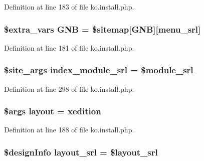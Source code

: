 Definition at line 183 of file ko.\+install.\+php.

\subsubsection[{\texorpdfstring{G\+NB}{GNB}}]{\setlength{\rightskip}{0pt plus 5cm}\${\bf extra\+\_\+vars} G\+NB = \$sitemap\mbox{[}\textquotesingle{}G\+NB\textquotesingle{}\mbox{]}\mbox{[}\textquotesingle{}menu\+\_\+srl\textquotesingle{}\mbox{]}}\hypertarget{ko_8install_8php_a9b1716b68fc04f3492448f38148dcbf5}{}\label{ko_8install_8php_a9b1716b68fc04f3492448f38148dcbf5}


Definition at line 181 of file ko.\+install.\+php.

\subsubsection[{\texorpdfstring{index\+\_\+module\+\_\+srl}{index_module_srl}}]{\setlength{\rightskip}{0pt plus 5cm}\$site\+\_\+args index\+\_\+module\+\_\+srl = \${\bf module\+\_\+srl}}\hypertarget{ko_8install_8php_acd0b17bfe6d14c82871d73fa39c9c22d}{}\label{ko_8install_8php_acd0b17bfe6d14c82871d73fa39c9c22d}


Definition at line 298 of file ko.\+install.\+php.

\subsubsection[{\texorpdfstring{layout}{layout}}]{\setlength{\rightskip}{0pt plus 5cm}\$args {\bf layout} = \textquotesingle{}xedition\textquotesingle{}}\hypertarget{ko_8install_8php_a0dc2cdff7167f362443808ff71ae5177}{}\label{ko_8install_8php_a0dc2cdff7167f362443808ff71ae5177}


Definition at line 188 of file ko.\+install.\+php.

\subsubsection[{\texorpdfstring{layout\+\_\+srl}{layout_srl}}]{\setlength{\rightskip}{0pt plus 5cm}\$design\+Info layout\+\_\+srl = \$layout\+\_\+srl}\hypertarget{ko_8install_8php_a70054876db09b2519a1726663c8dd9e7}{}\label{ko_8install_8php_a70054876db09b2519a1726663c8dd9e7}


